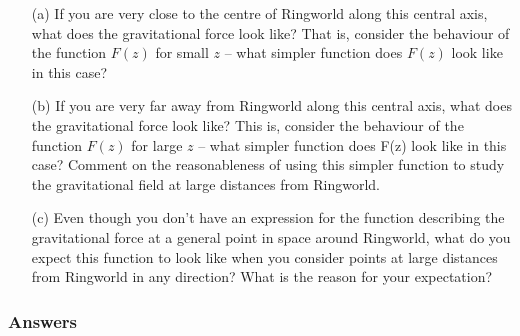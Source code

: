 \documentclass{exam}
\begin{document}
\begin{questions}
\begin{enumerate}
\item[(a)] If you are very close to the centre of Ringworld along this central axis, what does the gravitational force look like?  That is, consider the behaviour of the function $F(z)$ for small $z$ -- what simpler function does $F(z)$ look like in this case? 

\item[(b)] If you are very far away from Ringworld along this central axis, what does the gravitational force look like? This is, consider the behaviour of the function $F(z)$ for large $z$ -- what simpler function does F(z) look like in this case?  Comment on the reasonableness of using this simpler function to study the gravitational field at large distances from Ringworld.

\item[(c)] Even though you don't have an expression for the function describing the gravitational force at a general point in space around Ringworld, what do you expect this function to look like when you consider points at large distances from Ringworld in any direction?  What is the reason for your expectation?

\end{enumerate}


\color{blue}
\subsubsection*{Answers}
\color{black}

\end{questions}
\end{document}
